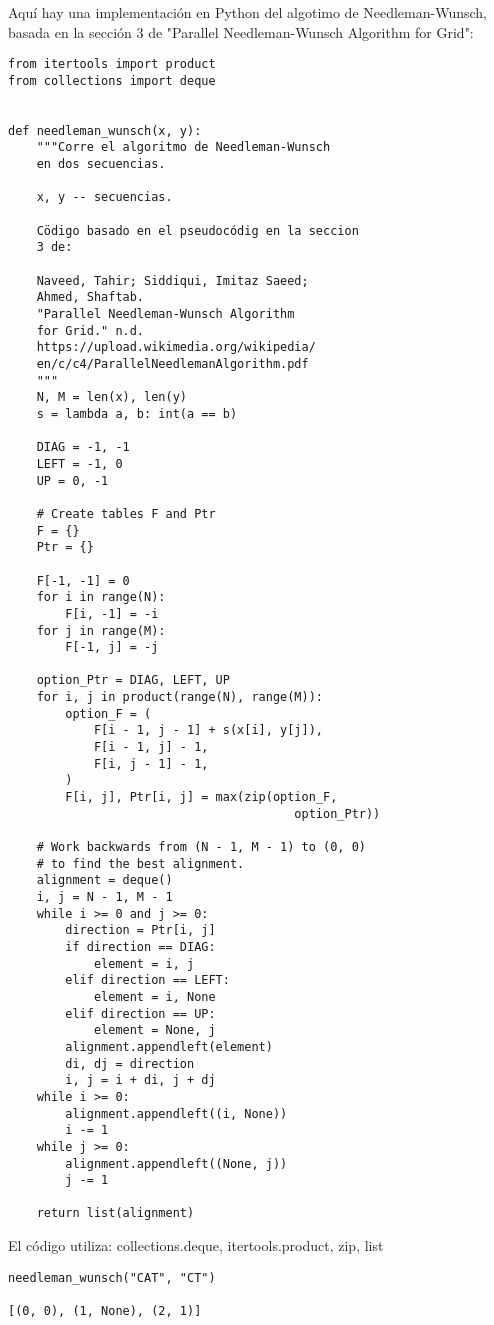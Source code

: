 \documentclass[usenatbib]{tjaa}
\begin{document}
Aquí hay una implementación en Python del algotimo de Needleman-Wunsch, basada en la sección 3 de  "Parallel Needleman-Wunsch Algorithm for Grid":
\begin{verbatim}
from itertools import product
from collections import deque


def needleman_wunsch(x, y):
    """Corre el algoritmo de Needleman-Wunsch
    en dos secuencias.

    x, y -- secuencias.

    Cödigo basado en el pseudocódig en la seccion
    3 de:

    Naveed, Tahir; Siddiqui, Imitaz Saeed; 
    Ahmed, Shaftab.
    "Parallel Needleman-Wunsch Algorithm 
    for Grid." n.d.
    https://upload.wikimedia.org/wikipedia/
    en/c/c4/ParallelNeedlemanAlgorithm.pdf
    """
    N, M = len(x), len(y)
    s = lambda a, b: int(a == b)

    DIAG = -1, -1
    LEFT = -1, 0
    UP = 0, -1

    # Create tables F and Ptr
    F = {}
    Ptr = {}

    F[-1, -1] = 0
    for i in range(N):
        F[i, -1] = -i
    for j in range(M):
        F[-1, j] = -j

    option_Ptr = DIAG, LEFT, UP
    for i, j in product(range(N), range(M)):
        option_F = (
            F[i - 1, j - 1] + s(x[i], y[j]),
            F[i - 1, j] - 1,
            F[i, j - 1] - 1,
        )
        F[i, j], Ptr[i, j] = max(zip(option_F, 
                                        option_Ptr))

    # Work backwards from (N - 1, M - 1) to (0, 0)
    # to find the best alignment.
    alignment = deque()
    i, j = N - 1, M - 1
    while i >= 0 and j >= 0:
        direction = Ptr[i, j]
        if direction == DIAG:
            element = i, j
        elif direction == LEFT:
            element = i, None
        elif direction == UP:
            element = None, j
        alignment.appendleft(element)
        di, dj = direction
        i, j = i + di, j + dj
    while i >= 0:
        alignment.appendleft((i, None))
        i -= 1
    while j >= 0:
        alignment.appendleft((None, j))
        j -= 1

    return list(alignment)
\end{verbatim}

El código utiliza: collections.deque, itertools.product, zip, list

\begin{verbatim}
needleman_wunsch("CAT", "CT")

[(0, 0), (1, None), (2, 1)]
\end{verbatim}
\end{document}
